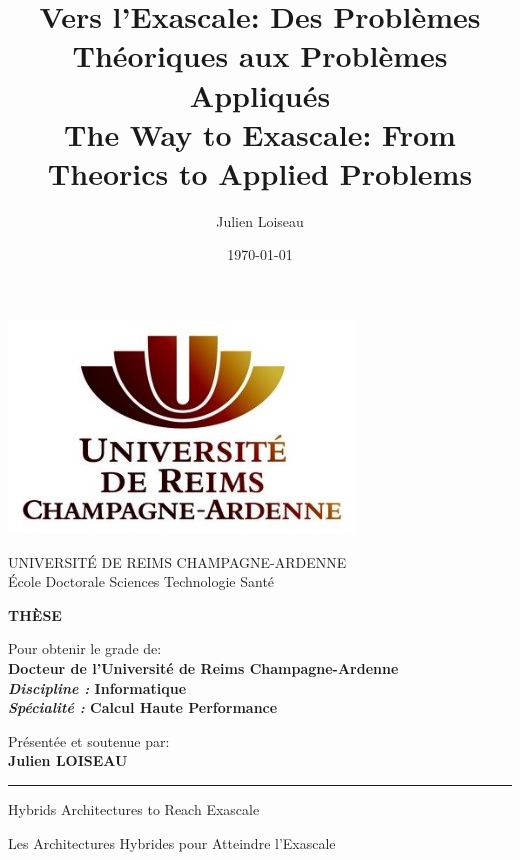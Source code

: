 \documentclass[11pt,a4paper]{book}
\title{Vers l'Exascale: Des Probl\`emes Th\'eoriques aux Probl\`emes Appliqu\'es\\
The Way to Exascale: From Theorics to Applied Problems}
\author{Julien Loiseau}
\date{\today}
\begin{document}
\thispagestyle{empty}
{%
%
\centering
{
\includegraphics[scale=1]{figures/style/logo_urca_front_page.jpg}
\vspace{0.5cm}
}

{
UNIVERSIT\'E DE REIMS CHAMPAGNE-ARDENNE\\
\vspace{0.5cm}
\'Ecole Doctorale Sciences Technologie Sant\'e
}

\vspace{1cm}
{
\huge
\textbf{TH\`ESE}
}
\vspace{.5cm}

{
	Pour obtenir le grade de:\\ 
	\vspace{.4cm}
	\Large 
	\textbf{Docteur de l'Université de Reims Champagne-Ardenne}\\
	\vspace{.4cm}
	\large
	\textbf{\textit{Discipline : }Informatique}\\
	\vspace{.4cm}
	\textbf{\textit{Sp\'ecialit\'e : }Calcul Haute Performance}
}

{
\vspace{1cm}
	Pr\'esent\'ee et soutenue par:\\
	\vspace{1cm}
\Large
	\textbf{Julien LOISEAU}
\vspace{1cm}
}

{\hrule height 2pt\vspace{2pt}}



{\huge 
\vspace{1cm}
Hybrids Architectures to Reach Exascale
}

{
\vspace{0.5cm}
Les Architectures Hybrides pour Atteindre l'Exascale 
}

}
\end{document}
